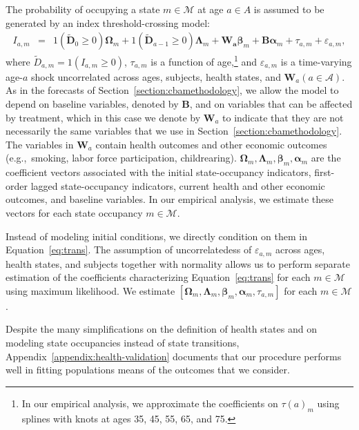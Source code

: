 The probability of occupying a state $m \in \mathcal{M}$ at age $a \in{A}$ is assumed to be generated by an index threshold-crossing model:
\begin{eqnarray}
I_{a,m} &=&  \bm{\mathit{1}} \left( \tilde{\bm{D}}_{0} \geq 0 \right) \bm{\Omega}_{m} + \bm{\mathit{1}} \left( \tilde{\bm{D}}_{a-1} \geq 0\right) \bm{\Lambda}_{m} + \bm{W_a} \bm{\beta}_{m} + \bm{B} \bm{\alpha}_m + \tau_{a,m} + \varepsilon_{a,m}, \label{eq:trans}
\end{eqnarray}
where $\tilde{D}_{a,m} = \bm{\mathit{1}}  \left( I_{a,m} \geq 0 \right)$, $\tau_{a,m}$ is a function of age,\footnote{In our empirical analysis, we approximate the coefficients on $\tau \left( a \right)_{m}$ using splines with knots at ages 35, 45, 55, 65, and 75.} and $\varepsilon_{a,m}$ is a time-varying age-$a$ shock uncorrelated across ages, subjects, health states, and $\bm{W}_a \left( a \in \mathcal{A} \right)$. As in the forecasts of Section~\ref{section:cbamethodology}, we allow the model to depend on baseline variables, denoted by $\bm{B}$, and on variables that can be affected by treatment, which in this case we denote by $\bm{W}_a$ to indicate that they are not necessarily the same variables that we use in Section~\ref{section:cbamethodology}. The variables in $\bm{W}_a$ contain health outcomes and other economic outcomes (e.g.,\ smoking, labor force participation, childrearing). $ \bm{\Omega}_{m},  \bm{\Lambda}_{m}, \bm{\beta}_{m},  \bm{\alpha}_{m}$ are the coefficient vectors associated with the initial state-occupancy indicators, first-order lagged state-occupancy indicators, current health and other economic outcomes, and baseline variables. In our empirical analysis, we estimate these vectors for each state occupancy $m \in \mathcal{M}$.

Instead of modeling initial conditions, we directly condition on them in Equation~\eqref{eq:trans}. The assumption of uncorrelatedess of $\varepsilon_{a,m}$ across ages, health states, and subjects together with normality allows us to perform separate estimation of the coefficients characterizing Equation~\eqref{eq:trans} for each $m \in \mathcal{M}$ using maximum likelihood. We estimate $\left[   \bm{\Omega}_{m}, \bm{\Lambda}_{m}, \bm{\beta}_{m}, \bm{\alpha}_{m}, \tau_{a,m}  \right]$ for each $m \in \mathcal{M}$.

Despite the many simplifications on the definition of health states and on modeling state occupancies instead of state transitions, Appendix~\ref{appendix:health-validation} documents that our procedure performs well in fitting populations means of the outcomes that we consider.

